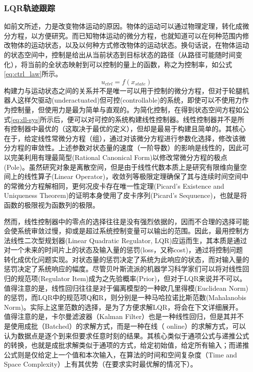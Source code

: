 \subsubsection{LQR轨迹跟踪}
如前文所述，力是改变物体运动的原因。物体的运动可以通过物理定理，转化成微分方程，以方便研究。而已知物体运动的微分方程，也就知道可以在何种范围内修改物体的运动状态，以及以何种方式修改物体的运动状态。换句话说，在物体运动的状态空间中，控制是给出从当前状态到目标状态的路径（从路径可能随时间变化），将当前的全状态映射到可以控制的量上的函数，称之为控制率，如公式\ref{eq:ctrl_law}所示。
\begin{equation}
    u_{ctrl} = f(x_{state})
    \label{eq:ctrl_law}
\end{equation}
构建力与运动状态之间的关系并不是唯一可以用于控制的微分方程，但对于轮腿机器人这样欠驱动(underactuated)但可控(controllable)的系统，即使可以不使用力作为控制量，但使用力是最为简单与直观的。为简化控制，在得到状态空间方程如公式\ref{eq:dl-sys}所示后，便可以对可控的系统构建线性控制器。线性控制器并不是所有控制器中最优的（这取决于最优的定义），但却是最易于构建且简单的。其核心在于，给定线性常微分方程（组），通过对该微分方程进行参数化选择，修改该微分方程的审敛性。上述参数对状态量的速度（一阶导数）的影响是线性的，因此可以完美利用有理最简型(Rational Canonical Form)以修改常微分方程的极点(Pole)。虽然研究对象是离散空间，但是由于线性代数本质上是研究有限维向量空间上的线性算子(Linear Operator)，收敛列等极限定理确保了其与连续时间空间中的常微分方程解相同，更何况皮卡存在唯一性定理(Picard's Existence and Uniqueness Theorem)的证明本身使用了皮卡序列(Picard's Sequuence)，也就是将函数的极限视为函数列的极限。

然而，线性控制器中的零点的选择往往是没有强烈依据的，因而不合理的选择可能会使系统审敛过慢，抑或是超过系统控制变量可以输出的范围。因此，最用控制方法线性二次型规划器(Linear Quadratic Regulator, LQR)应运而生，其本质是通过对一个未来的时间片上的状态及输入量的惩罚(loss，又称cost)，通过将控制问题转化成优化问题实现。对状态量的惩罚决定了系统为此响应的状态，而对输入量的惩罚决定了系统响应的幅度。尽管贝叶斯流派的机器学习科学家们可以将对线性回归的规范项(Regulator Item)成为之先验概率(Prior)，但对于LQR来说并不可以。值得注意的是，线性回归往往是对于偏离模型的一种欧几里得模(Euclidean Norm)的惩罚，而LQR中的规范项Q和R，则分别是一种马哈拉诺比斯范数(Mahalanobis Norm)。实际上这里范数的选择，是为了方便求解LQR，将会在下文详细展开。值得注意的是，卡尔曼滤波器（Kalman Filter）也是一种线性回归，但是其并不是使用成批（Batched）的求解方式，而是一种在线（
online）的求解方式，可以认为数据点是逐个到来但要求任意时刻的结果。其核心类似于通项公式与递推公式的转换，也就是成批求解类似于通项的方式，给定初始值，给定所有输入；而递推公式则是仅给定上一个值和本次输入，在算法的时间和空间复杂度（Time and Space Complexity）上有其优势（在要求实时最优解的情况下）。

